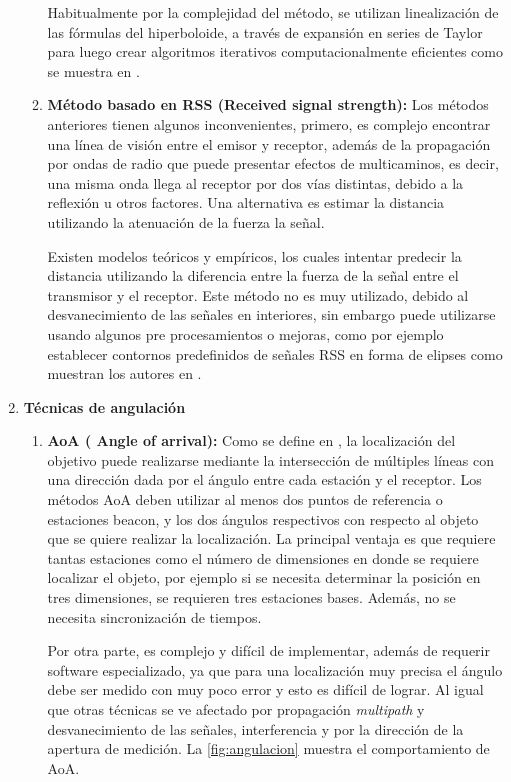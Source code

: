 \begin{enumerate}
\begin{enumerate}
Habitualmente por la complejidad del método, se utilizan linealización de las fórmulas del hiperboloide, a través de expansión en series de Taylor para luego crear algoritmos iterativos computacionalmente eficientes como se muestra en \citep{4103919}.

\item \textbf{Método basado en RSS (Received signal strength):}  Los métodos anteriores tienen algunos inconvenientes, primero, es complejo encontrar una línea de visión entre el emisor y receptor, además de la propagación por ondas de radio que puede presentar efectos de multicaminos, es decir, una misma onda llega al receptor por dos vías distintas, debido a la reflexión u otros factores. Una alternativa es estimar la distancia utilizando la atenuación de la fuerza la señal.

Existen modelos teóricos y empíricos, los cuales intentar predecir la distancia utilizando la diferencia entre la fuerza de la señal entre el transmisor y el receptor. Este método no es muy utilizado, debido al desvanecimiento de las señales en interiores, sin embargo puede utilizarse usando algunos pre procesamientos o mejoras, como por ejemplo establecer contornos predefinidos de señales RSS en forma de elipses como muestran los autores en \citep{1423549}.

\end{enumerate}

\item \textbf{Técnicas de angulación }
\begin{enumerate}
\item \textbf{AoA ( Angle of arrival):} Como se define en \citep{665} , la localización del objetivo puede realizarse mediante la intersección de múltiples líneas con una dirección dada por el ángulo entre cada estación y el receptor. Los métodos AoA deben utilizar al menos dos puntos de referencia o estaciones beacon,  y los dos ángulos respectivos con respecto al objeto que se quiere realizar la localización. La principal ventaja es que requiere tantas estaciones como el número de dimensiones en donde se requiere localizar el objeto, por ejemplo si se necesita determinar la posición en tres dimensiones, se requieren tres estaciones bases. Además, no se necesita sincronización de tiempos.

Por otra parte, es complejo y difícil de implementar, además de requerir software especializado, ya que para una localización muy precisa el ángulo debe ser medido con muy poco error y esto es difícil de lograr. Al igual que otras técnicas se ve afectado por propagación \textit{multipath} y desvanecimiento de las señales, interferencia y por la dirección de la apertura de medición. La \autoref{fig:angulacion} muestra el comportamiento de AoA.


\end{enumerate}
\end{enumerate}
